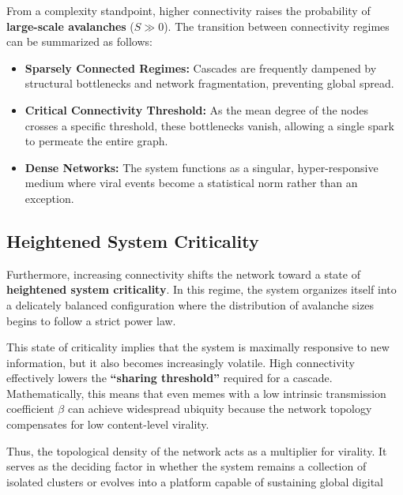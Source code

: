 \documentclass[12pt]{article}
\begin{document}
\vspace{0.6cm}

From a complexity standpoint, higher connectivity raises the probability of \textbf{large-scale avalanches} ($S \gg 0$). The transition between connectivity regimes can be summarized as follows:

\begin{itemize}
    \item \textbf{Sparsely Connected Regimes:} Cascades are frequently dampened by structural bottlenecks and network fragmentation, preventing global spread.
    \item \textbf{Critical Connectivity Threshold:} As the mean degree of the nodes crosses a specific threshold, these bottlenecks vanish, allowing a single spark to permeate the entire graph.
    \item \textbf{Dense Networks:} The system functions as a singular, hyper-responsive medium where viral events become a statistical norm rather than an exception.
\end{itemize}

\vfill %

\subsection{Heightened System Criticality}

Furthermore, increasing connectivity shifts the network toward a state of \textbf{heightened system criticality}. In this regime, the system organizes itself into a delicately balanced configuration where the distribution of avalanche sizes begins to follow a strict power law. 

\vspace{0.6cm}

This state of criticality implies that the system is maximally responsive to new information, but it also becomes increasingly volatile. High connectivity effectively lowers the \textbf{``sharing threshold''} required for a cascade. Mathematically, this means that even memes with a low intrinsic transmission coefficient $\beta$ can achieve widespread ubiquity because the network topology compensates for low content-level virality. 

\vspace{0.6cm}

\noindent Thus, the topological density of the network acts as a multiplier for virality. It serves as the deciding factor in whether the system remains a collection of isolated clusters or evolves into a platform capable of sustaining global digital
\end{document}
